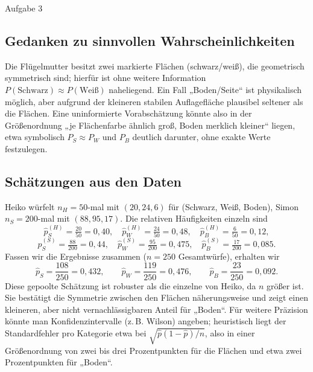 \documentclass[11pt,a4paper,oneside]{article}
\begin{document}
	\begin{loesung}{Aufgabe 3}
		\subsection*{Gedanken zu sinnvollen Wahrscheinlichkeiten}
		Die Flügelmutter besitzt zwei markierte Flächen (schwarz/weiß), die geometrisch symmetrisch sind; hierfür ist ohne weitere Information $P(\text{Schwarz})\approx P(\text{Weiß})$ naheliegend. Ein Fall „Boden/Seite“ ist physikalisch möglich, aber aufgrund der kleineren stabilen Auflagefläche plausibel seltener als die Flächen. Eine uninformierte Vorabschätzung könnte also in der Größenordnung „je Flächenfarbe ähnlich groß, Boden merklich kleiner“ liegen, etwa symbolisch $P_S\approx P_W$ und $P_B$ deutlich darunter, ohne exakte Werte festzulegen.
		
		\subsection*{Schätzungen aus den Daten}
		Heiko würfelt $n_H=50$-mal mit $(20,24,6)$ für (Schwarz, Weiß, Boden), Simon $n_S=200$-mal mit $(88,95,17)$. Die relativen Häufigkeiten einzeln sind
		\[
		\hat p^{(H)}_S= \tfrac{20}{50}=0{,}40,\quad 
		\hat p^{(H)}_W= \tfrac{24}{50}=0{,}48,\quad
		\hat p^{(H)}_B= \tfrac{6}{50}=0{,}12,
		\]
		\[
		\hat p^{(S)}_S= \tfrac{88}{200}=0{,}44,\quad 
		\hat p^{(S)}_W= \tfrac{95}{200}=0{,}475,\quad
		\hat p^{(S)}_B= \tfrac{17}{200}=0{,}085.
		\]
		Fassen wir die Ergebnisse zusammen ($n=250$ Gesamtwürfe), erhalten wir
		\[
		\hat p_S=\frac{108}{250}=0{,}432,\qquad
		\hat p_W=\frac{119}{250}=0{,}476,\qquad
		\hat p_B=\frac{23}{250}=0{,}092.
		\]
		Diese gepoolte Schätzung ist robuster als die einzelne von Heiko, da $n$ größer ist. Sie bestätigt die Symmetrie zwischen den Flächen näherungsweise und zeigt einen kleineren, aber nicht vernachlässigbaren Anteil für „Boden“. Für weitere Präzision könnte man Konfidenzintervalle (z.\,B. Wilson) angeben; heuristisch liegt der Standardfehler pro Kategorie etwa bei $\sqrt{\hat p(1-\hat p)/n}$, also in einer Größenordnung von zwei bis drei Prozentpunkten für die Flächen und etwa zwei Prozentpunkten für „Boden“.
	\end{loesung}
	
\end{document}
